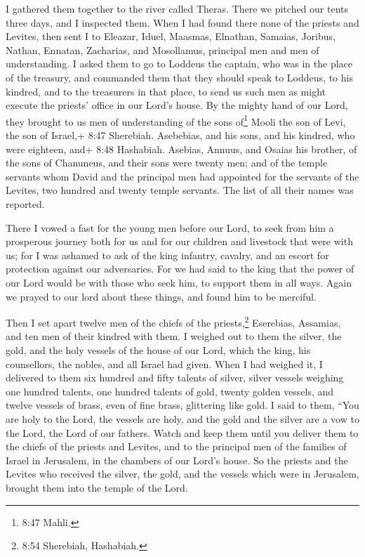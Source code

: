 I gathered them together to the river called Theras. There
we pitched our tents three days, and I inspected them. 
When I had found there none of the priests and Levites, 
then sent I to Eleazar, Iduel, Maasmas,  Elnathan, Samaias,
Joribus, Nathan, Ennatan, Zacharias, and Mosollamus, principal men and
men of understanding.  I asked them to go to Loddeus the
captain, who was in the place of the treasury,  and
commanded them that they should speak to Loddeus, to his kindred, and to
the treasurers in that place, to send us such men as might execute the
priests' office in our Lord's house.  By the mighty hand of
our Lord, they brought to us men of understanding of the sons
of\footnote{8:47 Mahli.} Mooli the son of Levi, the son of Israel,+ 8:47
Sherebiah. Asebebias, and his sons, and his kindred, who were eighteen,
 and+ 8:48 Hashabiah. Asebias, Annuus, and Osaias his
brother, of the sons of Chanuneus, and their sons were twenty men;
 and of the temple servants whom David and the principal
men had appointed for the servants of the Levites, two hundred and
twenty temple servants. The list of all their names was reported.

 There I vowed a fast for the young men before our Lord, to
seek from him a prosperous journey both for us and for our children and
livestock that were with us;  for I was ashamed to ask of
the king infantry, cavalry, and an escort for protection against our
adversaries.  For we had said to the king that the power of
our Lord would be with those who seek him, to support them in all ways.
 Again we prayed to our lord about these things, and found
him to be merciful.

 Then I set apart twelve men of the chiefs of the
priests,\footnote{8:54 Sherebiah, Hashabiah.} Eserebias, Assamias, and
ten men of their kindred with them.  I weighed out to them
the silver, the gold, and the holy vessels of the house of our Lord,
which the king, his counsellors, the nobles, and all Israel had given.
 When I had weighed it, I delivered to them six hundred and
fifty talents of silver, silver vessels weighing one hundred talents,
one hundred talents of gold,  twenty golden vessels, and
twelve vessels of brass, even of fine brass, glittering like gold.
 I said to them, ``You are holy to the Lord, the vessels
are holy, and the gold and the silver are a vow to the Lord, the Lord of
our fathers.  Watch and keep them until you deliver them to
the chiefs of the priests and Levites, and to the principal men of the
families of Israel in Jerusalem, in the chambers of our Lord's house.
 So the priests and the Levites who received the silver,
the gold, and the vessels which were in Jerusalem, brought them into the
temple of the Lord.

